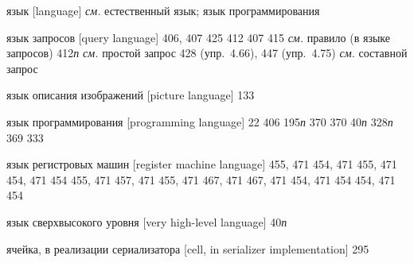 \begin{theindex}
\item {язык [language]} {\it см.} естественный язык; язык программирования
\item {язык запросов [query language]} 406, 407
   425
   412
   407
   415
   {\it см.} правило (в языке запросов)
   412{\it п}
   {\it см.} простой запрос
   428 (упр.~4.66), 447 (упр.~4.75)
   {\it см.} составной запрос
\item {язык описания изображений [picture language]} 133
\item {язык программирования [programming language]} 22
   406
   195{\it п}
   370
   370
   40{\it п}
   328{\it п}
   369
   333
\item {язык регистровых машин [register machine language]}
   455, 471
   454, 471
   455, 471
   454, 471
   454
   455, 471
   457, 471
   455, 471
   467, 471
   467, 471
   454, 471
   454
   454, 471
   454
\item {язык сверхвысокого уровня [very high-level language]} 40{\it п}
\item {ячейка, в реализации сериализатора [cell, in serializer implementation]} 295
\end{theindex}
